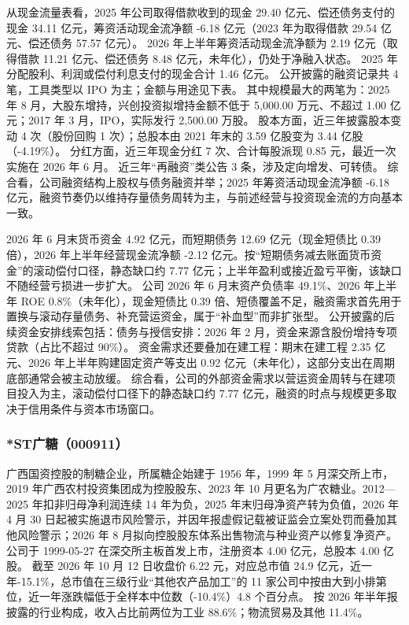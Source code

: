  从现金流量表看，2025 年公司取得借款收到的现金 29.40 亿元、偿还债务支付的现金 34.11 亿元，筹资活动现金流净额 -6.18 亿元（2023 年为取得借款 29.54 亿元、偿还债务 57.57 亿元）。 2026 年上半年筹资活动现金流净额为 2.19 亿元（取得借款 11.21 亿元、偿还债务 8.48 亿元，未年化），仍处于净融入状态。 2025 年分配股利、利润或偿付利息支付的现金合计 1.46 亿元。 公开披露的融资记录共 4 笔，工具类型以 IPO 为主；金额与用途见下表。 其中规模最大的两笔为：2025 年 8 月，大股东增持，兴创投资拟增持金额不低于 5,000.00 万元、不超过 1.00 亿元；2017 年 3 月，IPO，实际发行 2,500.00 万股。 股本方面，近三年披露股本变动 4 次（股份回购 1 次）；总股本由 2021 年末的 3.59 亿股变为 3.44 亿股（-4.19\%）。 分红方面，近三年现金分红 7 次、合计每股派现 0.85 元，最近一次实施在 2026 年 6 月。 近三年“再融资”类公告 3 条，涉及定向增发、可转债。 综合看，公司融资结构上股权与债务融资并举；2025 年筹资活动现金流净额 -6.18 亿元，融资节奏仍以维持存量债务周转为主，与前述经营与投资现金流的方向基本一致。

 2026 年 6 月末货币资金 4.92 亿元，而短期债务 12.69 亿元（现金短债比 0.39 倍），2026 年上半年经营现金流净额 -2.12 亿元。按“短期债务减去账面货币资金”的滚动偿付口径，静态缺口约 7.77 亿元；上半年盈利或接近盈亏平衡，该缺口不随经营亏损进一步扩大。 公司 2026 年 6 月末资产负债率 49.1\%、2026 年上半年 ROE 0.8\%（未年化），现金短债比 0.39 倍、短债覆盖不足，融资需求首先用于置换与滚动存量债务、补充营运资金，属于“补血型”而非扩张型。 公开披露的后续资金安排线索包括：债务与授信安排：2026 年 2 月，资金来源含股份增持专项贷款（占比不超过 90\%）。 资金需求还要叠加在建工程：期末在建工程 2.35 亿元、2026 年上半年购建固定资产等支出 0.92 亿元（未年化），这部分支出在周期底部通常会被主动放缓。 综合看，公司的外部资金需求以营运资金周转与在建项目投入为主，滚动偿付口径下的静态缺口约 7.77 亿元，融资的时点与规模更多取决于信用条件与资本市场窗口。




\subsubsection{*ST广糖（000911）}
\label{co:000911}

 广西国资控股的制糖企业，所属糖企始建于 1956 年，1999 年 5 月深交所上市，2019 年广西农村投资集团成为控股股东、2023 年 10 月更名为广农糖业。2012—2025 年扣非归母净利润连续 14 年为负，2025 年末归母净资产转为负值，2026 年 4 月 30 日起被实施退市风险警示，并因年报虚假记载被证监会立案处罚而叠加其他风险警示；2026 年 8 月拟向控股股东体系出售物流与种业资产以修复净资产。 公司于 1999-05-27 在深交所主板首发上市，注册资本 4.00 亿元，总股本 4.00 亿股。 截至 2026 年 10 月 12 日收盘价 6.22 元，对应总市值 24.9 亿元，近一年-15.1\%，总市值在三级行业“其他农产品加工”的 11 家公司中按由大到小排第位，近一年涨跌幅低于全样本中位数（-10.4\%）4.8 个百分点。 按 2026 年半年报披露的行业构成，收入占比前两位为工业 88.6\%；物流贸易及其他 11.4\%。

